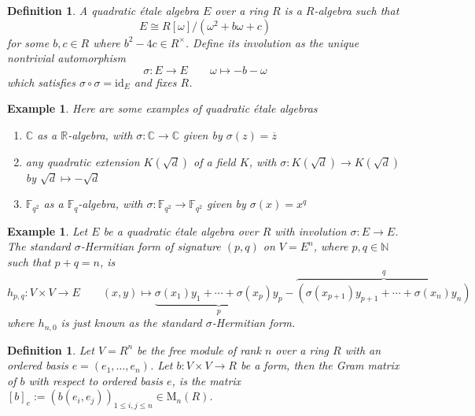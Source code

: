 \documentclass[10pt]{book}
\theoremstyle{bookplain}
\theoremstyle{bookdefinition}
\newtheorem{definition}[theorem]{Definition}
\newtheorem{example}[theorem]{Example}
\theoremstyle{bookremark}
\begin{document}
\begin{definition}
    \label{def:quadetale}
    A \textit{quadratic étale algebra} $E$ over a ring $R$ is a $R$-algebra such that \[E\cong R[\omega]/(\omega^2+b\omega+c)\]
    for some $b,c\in R$ where $b^2-4c\in R^\times$. Define its \textit{involution} as the unique nontrivial automorphism 
    \[\sigma:E\rightarrow E\qquad \omega\mapsto -b-\omega\]
    which satisfies $\sigma\circ \sigma=\mathrm{id}_E$ and fixes $R$. 
\end{definition}
\begin{example}Here are some examples of quadratic étale algebras
    \begin{enumerate}
        \item $\mathbb C$ as a $\mathbb R$-algebra, with $\sigma:\mathbb C\rightarrow\mathbb C$ given by $\sigma(z)=\overline{z}$
        \item any quadratic extension $K(\sqrt{d})$ of a field $K$, with $\sigma:K(\sqrt{d})\rightarrow K(\sqrt{d})$ by $\sqrt{d}\mapsto -\sqrt{d}$
        \item $\mathbb F_{q^2}$ as a $\mathbb F_{q}$-algebra, with $\sigma:\mathbb F_{q^2}\rightarrow\mathbb F_{q^2}$ given by $\sigma(x)=x^q$
    \end{enumerate}
\end{example}
\begin{example}Let $E$ be a quadratic étale algebra over $R$ with involution $\sigma:E\rightarrow E$. The \textit{standard $\sigma$-Hermitian form} of signature $(p,q)$ on $V=E^n$, where $p,q\in\mathbb N$ such that $p+q=n$, is 
    \[h_{p,q}:V\times V\rightarrow E\qquad (x,y)\mapsto \underbrace{\sigma(x_1)y_1+\cdots+\sigma(x_p)y_p}_p-\overbrace{(\sigma(x_{p+1})y_{p+1}+\cdots+\sigma(x_n)y_n)}^q\]
    where $h_{n,0}$ is just known as the \textit{standard $\sigma$-Hermitian form}. 
\end{example}

\begin{definition}Let $V=R^n$ be the free module of rank $n$ over a ring $R$ with an ordered basis $e=(e_1,\dots,e_n)$. 
    Let $b:V\times V\rightarrow R$ be a form, then the \textit{Gram matrix} of $b$ with respect to ordered basis $e$, is the matrix $[b]_e:=(b(e_i,e_j))_{1\le i,j\le n}\in \mathrm M_n(R)$. 
\end{definition}
\end{document}
